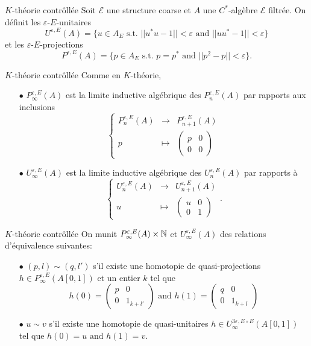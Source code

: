 \begin{frame}{$K$-théorie contrôllée}
Soit $\mathcal E$ une structure coarse et $A$ une $C^*$-algèbre $\mathcal E$ filtrée. On définit les $\varepsilon$-$E$-unitaires
\[U^{\varepsilon, E}(A)= \{u\in A_E \text{ s.t. } ||u^*u-1||<\varepsilon\text{ and }||uu^*-1||<\varepsilon \}\]
et les $\varepsilon$-$E$-projections 
\[P^{\varepsilon, E}(A)= \{p\in A_E \text{ s.t. } p=p^*\text{ and }||p^2-p||<\varepsilon \}.\]
\end{frame}

\begin{frame}{$K$-théorie contrôllée}
Comme en $K$-théorie, 
\begin{itemize}
\item[$\bullet$] $P_\infty^{\varepsilon, E}(A)$ est la limite inductive algébrique des $P_n^{\varepsilon, E}(A)$ par rapports aux inclusions
\[\left\{\begin{array}{rcl}
	P^{\varepsilon,E}_n(A) 		& \rightarrow	& P^{\varepsilon,E}_{n+1}(A)\\ 
	p 		& \mapsto 	& \begin{pmatrix}p& 0 \\ 0&0 \end{pmatrix}
\end{array}\right.\]
\item[$\bullet$] $U_\infty^{\varepsilon, E}(A)$ est la limite inductive algébrique des $U_n^{\varepsilon, E}(A)$ par rapports à
\[\left\{\begin{array}{rcl}
	U^{\varepsilon,E}_n(A) 		& \rightarrow	& U^{\varepsilon,E}_{n+1}(A)\\ 
	u 		& \mapsto 	& \begin{pmatrix}u & 0 \\ 0& 1 \end{pmatrix}
\end{array}\right. .\]
\end{itemize}
\end{frame}

\begin{frame}{$K$-théorie contrôllée}
On munit $P_\infty^{\varepsilon, E}(A)\times \mathbb N$ et $U_\infty^{\varepsilon, E}(A)$ des relations d'équivalence suivantes:
\begin{itemize}
\item[$\bullet$] $(p,l) \sim (q,l')$ s'il existe une homotopie de quasi-projections $h\in P^{\varepsilon, E}_\infty(A[0,1])$ et un entier $k$ tel que 
\[h(0)=\begin{pmatrix} p & 0 \\ 0 & 1_{k+l'} \end{pmatrix} \text{ and }
h(1)=\begin{pmatrix} q & 0 \\ 0 & 1_{k+l} \end{pmatrix}\]
\item[$\bullet$] $u \sim v$ s'il existe une homotopie de quasi-unitaires $h\in U^{3\varepsilon, E\circ E}_\infty(A[0,1])$ tel que $h(0)= u \text{ and }h(1)=v$.\\
\end{itemize}
\end{frame}

